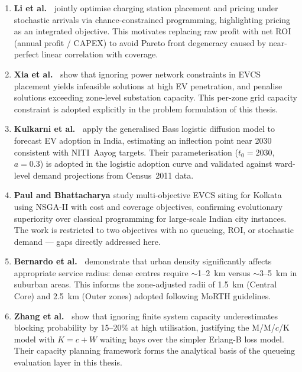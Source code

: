 \begin{enumerate}
\item \textbf{Li et al.\ \cite{li_joint_2022}} jointly optimise charging
station placement and pricing under stochastic arrivals via chance-constrained
programming, highlighting pricing as an integrated objective. This motivates
replacing raw profit with net ROI (annual profit / CAPEX) to avoid Pareto
front degeneracy caused by near-perfect linear correlation with coverage.

\item \textbf{Xia et al.\ \cite{xia_grid_2022}} show that ignoring power
network constraints in EVCS placement yields infeasible solutions at high EV
penetration, and penalise solutions exceeding zone-level substation capacity.
This per-zone grid capacity constraint is adopted explicitly in the problem
formulation of this thesis.

\item \textbf{Kulkarni et al.\ \cite{kulkarni_bass_2021}} apply the
generalised Bass logistic diffusion model to forecast EV adoption in India,
estimating an inflection point near 2030 consistent with NITI~Aayog targets.
Their parameterisation ($t_0 = 2030$, $a = 0.3$) is adopted in the logistic
adoption curve and validated against ward-level demand projections from
Census~2011 data.

\item \textbf{Paul and Bhattacharya \cite{paul_nsga2_2021}} study
multi-objective EVCS siting for Kolkata using NSGA-II with cost and coverage
objectives, confirming evolutionary superiority over classical programming for
large-scale Indian city instances. The work is restricted to two objectives
with no queueing, ROI, or stochastic demand --- gaps directly addressed here.

\item \textbf{Bernardo et al.\ \cite{bernardo_density_2021}} demonstrate that
urban density significantly affects appropriate service radius: dense centres
require $\sim$1--2~km versus $\sim$3--5~km in suburban areas. This informs the
zone-adjusted radii of 1.5~km (Central Core) and 2.5~km (Outer zones) adopted
following MoRTH guidelines.

\item \textbf{Zhang et al.\ \cite{zhang_mmck_2019}} show that ignoring finite
system capacity underestimates blocking probability by 15--20\% at high
utilisation, justifying the M/M/$c$/K model with $K = c + W$ waiting bays over
the simpler Erlang-B loss model. Their capacity planning framework forms the
analytical basis of the queueing evaluation layer in this thesis.


\end{enumerate}
